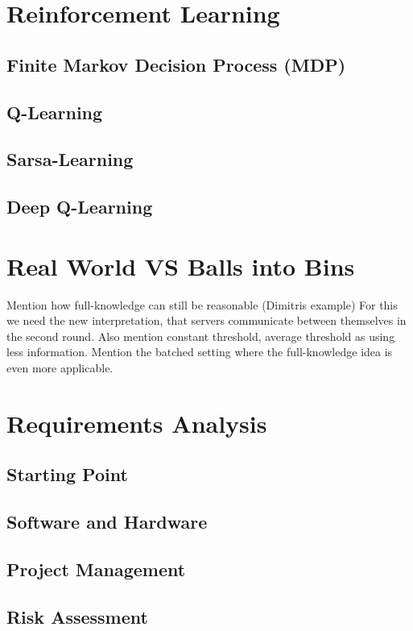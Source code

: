 \section{Reinforcement Learning}


\subsection{Finite Markov Decision Process (MDP)}


\subsection{Q-Learning}


\subsection{Sarsa-Learning}


\subsection{Deep Q-Learning}


\section{Real World VS Balls into Bins} \label{alternative}


Mention how full-knowledge can still be reasonable (Dimitris example)
For this we need the new interpretation, that servers communicate between themselves in the second round.
Also mention constant threshold, average threshold as using less information.
Mention the batched setting where the full-knowledge idea is even more applicable.


\section{Requirements Analysis}


\subsection{Starting Point}


\subsection{Software and Hardware}


\subsection{Project Management}


\subsection{Risk Assessment}